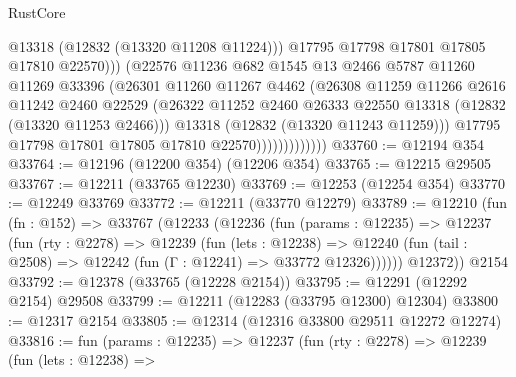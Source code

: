 \begin{lexlean}{RustCore}
\begin{coremodule}
                                  @13318
                                  (@12832 (@13320 @11208 @11224)))
                                @17795
                                @17798
                                @17801
                                @17805
                                @17810
                                @22570)))
                          (@22576
                            @11236
                            @682
                            @1545
                            @13
                            @2466
                            @5787
                            @11260
                            @11269
                            @33396
                            (@26301
                              @11260
                              @11267
                              @4462
                              (@26308
                                @11259
                                @11266
                                @2616
                                @11242
                                @2460
                                @22529
                                (@26322
                                  @11252
                                  @2460
                                  @26333
                                  @22550
                                  @13318
                                  (@12832 (@13320 @11253 @2466)))
                                @13318
                                (@12832 (@13320 @11243 @11259)))
                              @17795
                              @17798
                              @17801
                              @17805
                              @17810
                              @22570)))))))))))))
@33760 := @12194 @354
@33764 := @12196 (@12200 @354) (@12206 @354)
@33765 := @12215 @29505
@33767 := @12211 (@33765 @12230)
@33769 := @12253 (@12254 @354)
@33770 := @12249 @33769
@33772 := @12211 (@33770 @12279)
@33789 := @12210
    (fun (fn : @152) =>
    @33767
      (@12233
        (@12236
          (fun (params : @12235) =>
          @12237
            (fun (rty : @2278) =>
            @12239
              (fun (lets : @12238) =>
              @12240 (fun (tail : @2508) => @12242 (fun (Γ : @12241) => @33772 @12326))))))
        @12372))
    @2154
@33792 := @12378 (@33765 (@12228 @2154))
@33795 := @12291 (@12292 @2154) @29508
@33799 := @12211 (@12283 (@33795 @12300) @12304)
@33800 := @12317 @2154
@33805 := @12314 (@12316 @33800 @29511 @12272 @12274)
@33816 := fun (params : @12235) =>
  @12237
    (fun (rty : @2278) =>
    @12239
      (fun (lets : @12238) =>

\end{coremodule}
\end{lexlean}
